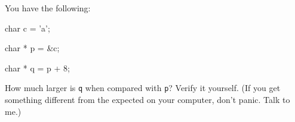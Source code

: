 You have the following:



\begin{consolethree}[escapeinside=||]

char c = 'a';

char * p = &c;

char * q = p + 8;

\end{consolethree}



How much larger is \texttt{q} when compared with \texttt{p}? Verify it yourself. (If you get something different from the expected on your computer, don't panic. Talk to me.)

